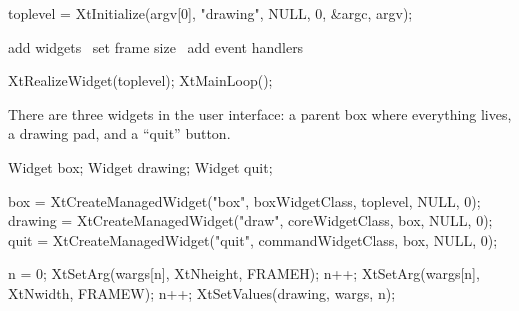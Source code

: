 \nwenddocs{}\endmoddef\nwstartdeflinemarkup{}\nwenddeflinemarkup
toplevel = XtInitialize(argv[0], "drawing", NULL, 0, &argc, argv);

\LA{}add widgets~{\nwtagstyle{}}\RA{}
\LA{}set frame size~{\nwtagstyle{}}\RA{}
\LA{}add event handlers~{\nwtagstyle{}}\RA{}

XtRealizeWidget(toplevel);
XtMainLoop();
\nwendcode{}\nwdocspar

There are three widgets in the user interface: a parent box where
everything lives, a drawing pad, and a ``quit'' button.

\nwenddocs{}\plusendmoddef\nwstartdeflinemarkup{}\nwenddeflinemarkup
Widget box;
Widget drawing;
Widget quit;
\nwendcode{}\nwdocspar

\nwenddocs{}\endmoddef\nwstartdeflinemarkup{}\nwenddeflinemarkup
box     = XtCreateManagedWidget("box",  boxWidgetClass,  toplevel, NULL, 0);
drawing = XtCreateManagedWidget("draw", coreWidgetClass,    box, NULL, 0);
quit    = XtCreateManagedWidget("quit", commandWidgetClass, box, NULL, 0);
\nwendcode{}\nwdocspar

\nwenddocs{}\endmoddef\nwstartdeflinemarkup{}\nwenddeflinemarkup
n = 0;
XtSetArg(wargs[n], XtNheight, FRAMEH); n++;
XtSetArg(wargs[n], XtNwidth,  FRAMEW); n++;
XtSetValues(drawing, wargs, n);

